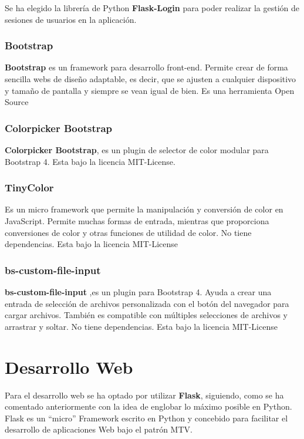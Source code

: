 Se ha elegido la librería de Python \textbf{Flask-Login} para poder realizar la gestión de sesiones de usuarios en la aplicación.


\subsubsection{Bootstrap}

\textbf{Bootstrap} es un framework para desarrollo front-end. Permite crear de forma sencilla webs de diseño adaptable, es decir, que se ajusten a cualquier dispositivo y tamaño de pantalla y siempre se vean igual de bien.
Es una herramienta Open Source


\subsubsection{Colorpicker Bootstrap}

\textbf{Colorpicker Bootstrap},  es un plugin de selector de color modular para Bootstrap 4. Esta bajo la licencia MIT-License.


\subsubsection{TinyColor}

Es un micro framework que permite la manipulación y conversión de color en JavaScript. Permite muchas formas de entrada, mientras que proporciona conversiones de color y otras funciones de utilidad de color. No tiene dependencias. Esta bajo la licencia MIT-License


\subsubsection{bs-custom-file-input}

\textbf{bs-custom-file-input} ,es un plugin para Bootstrap 4. Ayuda a crear una entrada de selección de archivos personalizada con el botón del navegador para cargar archivos. También es compatible con múltiples selecciones de archivos y arrastrar y soltar.
No tiene dependencias. Esta bajo la licencia MIT-License

\section{Desarrollo Web}

Para el desarrollo web se ha optado por utilizar \textbf{Flask}, siguiendo, como se ha comentado anteriormente con la idea de englobar lo máximo posible en Python.
Flask es un “micro” Framework escrito en Python y concebido para facilitar el desarrollo de aplicaciones Web bajo el patrón MTV.

